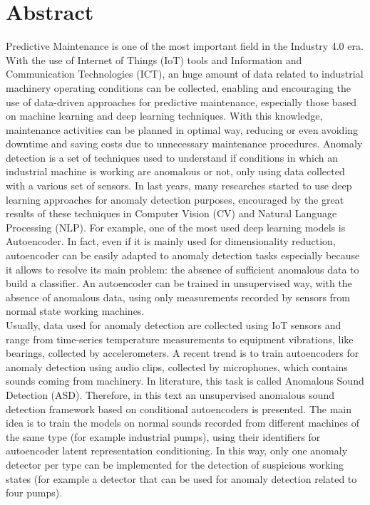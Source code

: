 \chapter{Abstract} 

Predictive Maintenance is one of the most important field in the Industry 4.0 era. With the use of Internet of Things (IoT) tools and Information and Communication Technologies (ICT), an huge amount of data related to industrial machinery operating conditions can be collected, enabling and encouraging the use of data-driven approaches for predictive maintenance, especially those based on machine learning and deep learning techniques. With this knowledge, maintenance activities can be planned in optimal way, reducing or even avoiding downtime and saving costs due to unnecessary maintenance procedures.
Anomaly detection is a set of techniques used to understand if conditions in which an industrial machine is working are anomalous or not, only using data collected with a various set of sensors. In last years, many researches started to use deep learning approaches for anomaly detection purposes, encouraged by the great results of these techniques in Computer Vision (CV) and Natural Language Processing (NLP). For example, one of the most used deep learning models is Autoencoder. In fact, even if it is mainly used for dimensionality reduction, autoencoder can be easily adapted to anomaly detection tasks especially because it allows to resolve its main problem: the absence of sufficient anomalous data to build a classifier. An autoencoder can be trained in unsupervised way, with the absence of anomalous data, using only measurements recorded by sensors from normal state working machines.\\ 
Usually, data used for anomaly detection are collected using IoT sensors and range from time-series temperature measurements to equipment vibrations, like bearings, collected by accelerometers. A recent trend is to train autoencoders for anomaly detection using audio clips, collected by microphones, which contains sounds coming from machinery. In literature, this task is called Anomalous Sound Detection (ASD). Therefore, in this text an unsupervised anomalous sound detection framework based on conditional autoencoders is presented. The main idea is to train the models on normal sounds recorded from different machines of the same type (for example industrial pumps), using their identifiers for autoencoder latent representation conditioning. In this way, only one anomaly detector per type can be implemented for the detection of suspicious working states (for example a detector that can be used for anomaly detection related to four pumps).\\
